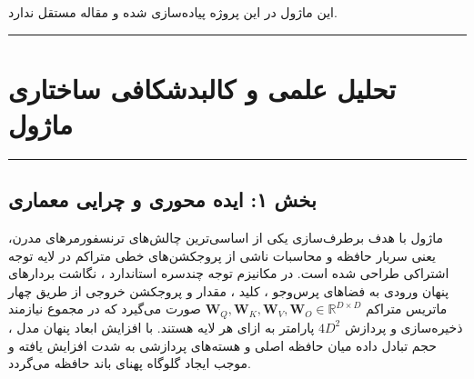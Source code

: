 \clearpage
{}
\vspace*{0.2cm}

این ماژول در این پروژه پیاده‌سازی شده و مقاله مستقل ندارد.
\noindent\rule{\textwidth}{1.2pt}
\vspace*{0.1cm}
\section{تحلیل علمی و کالبدشکافی ساختاری ماژول }
\label{sec:mod_minimal_aurora}
\vspace*{-0.2cm}
\noindent\rule{\textwidth}{0.5pt}
\vspace*{0.3cm}

\subsection*{بخش ۱: ایده محوری و چرایی معماری }
ماژول  با هدف برطرف‌سازی یکی از اساسی‌ترین چالش‌های ترنسفورمرهای مدرن، یعنی سربار حافظه و محاسبات ناشی از پروجکشن‌های خطی متراکم  در لایه توجه اشتراکی طراحی شده است. در مکانیزم توجه چندسره استاندارد ، نگاشت بردارهای پنهان ورودی به فضاهای پرس‌وجو ، کلید ، مقدار  و پروجکشن خروجی  از طریق چهار ماتریس متراکم $\mathbf{W}_Q, \mathbf{W}_K, \mathbf{W}_V, \mathbf{W}_O \in \mathbb{R}^{D \times D}$ صورت می‌گیرد که در مجموع نیازمند ذخیره‌سازی و پردازش $4D^2$ پارامتر به ازای هر لایه هستند. با افزایش ابعاد پنهان مدل ، حجم تبادل داده میان حافظه اصلی و هسته‌های پردازشی به شدت افزایش یافته و موجب ایجاد گلوگاه پهنای باند حافظه  می‌گردد.

